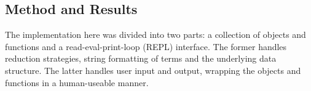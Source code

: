 \subsection{Method and Results}

    The implementation here was divided into two parts: a collection of objects and functions and a read-eval-print-loop (REPL) interface.
    The former handles reduction strategies, string formatting of terms and the underlying data structure.
    The latter handles user input and output, wrapping the objects and functions in a human-useable manner.
